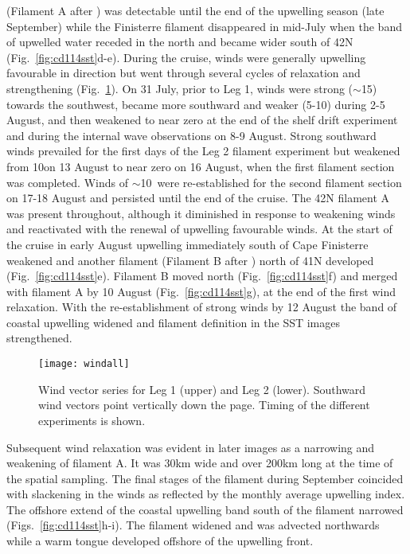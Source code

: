 (Filament A after \citet{Smyth01}) was detectable until the end of
the upwelling season (late September) while the Finisterre
filament disappeared in mid-July when the band of upwelled water
receded in the north and became wider south of 42\deg N
(Fig.~\ref{fig:cd114sst}d-e). During the cruise, winds were
generally upwelling favourable in direction but went through
several cycles of relaxation and strengthening
(Fig.~\ref{fig:cd114winds}).  On 31 July, prior to Leg 1, winds
were strong ($\sim$15\vel) towards the southwest, became more
southward and weaker (5-10\vel) during 2-5 August, and then
weakened to near zero at the end of the shelf drift experiment and
during the internal wave observations on 8-9 August. Strong
southward winds prevailed for the first days of the Leg 2 filament
experiment but weakened from 10\vel on 13 August to near zero on
16 August, when the first filament section was completed. Winds of
$\sim$10\vel\, were re-established for the second filament section
on 17-18 August and persisted until the end of the cruise. The
42\deg N filament A was present throughout, although it diminished
in response to weakening winds and reactivated with the renewal of
upwelling favourable winds. At the start of the cruise in early
August upwelling immediately south of Cape Finisterre weakened and
another filament (Filament B after \citet{Smyth01}) north of
41\deg N developed (Fig.~\ref{fig:cd114sst}e). Filament B moved
north (Fig.~\ref{fig:cd114sst}f) and merged with filament A by 10
August (Fig.~\ref{fig:cd114sst}g), at the end of the first wind
relaxation. With the re-establishment of strong winds by 12 August
the band of coastal upwelling widened and filament definition in
the SST images strengthened. \arribacap
\begin{figure}
\centering %
\texttt{[image: windall]}%
\caption{Wind vector series for Leg 1 (upper) and Leg 2 (lower).
Southward wind vectors point vertically down the page.
Timing of the different experiments is shown.}%
\label{fig:cd114winds}%
\end{figure}
Subsequent wind relaxation was evident in later images as a
narrowing and weakening of filament A. It was 30km wide and over
200km long at the time of the spatial sampling. The final stages
of the filament during September coincided with slackening in the
winds as reflected by the monthly average upwelling index. The
offshore extend of the coastal upwelling band south of the
filament narrowed (Figs.~\ref{fig:cd114sst}h-i). The filament
widened and was advected northwards while a warm tongue developed
offshore of the upwelling front.
